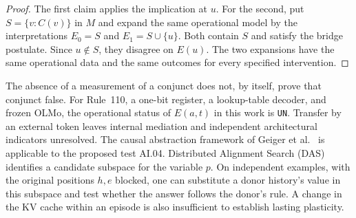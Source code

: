\begin{proof}
The first claim applies the implication at $u$. For the second, put $S=\{v:C(v)\}$ in $M$ and expand the same operational model by the interpretations $E_0=S$ and $E_1=S\cup\{u\}$. Both contain $S$ and satisfy the bridge postulate. Since $u\notin S$, they disagree on $E(u)$. The two expansions have the same operational data and the same outcomes for every specified intervention.
\end{proof}
The absence of a measurement of a conjunct does not, by itself, prove that conjunct false. For Rule~110, a one-bit register, a lookup-table decoder, and frozen OLMo, the operational status of $E(a,t)$ in this work is \texttt{UN}. Transfer by an external token leaves internal mediation and independent architectural indicators unresolved. The causal abstraction framework of Geiger et al.~\cite{geiger2025} is applicable to the proposed test AI.04. Distributed Alignment Search (DAS) identifies a candidate subspace for the variable $p$. On independent examples, with the original positions $h,e$ blocked, one can substitute a donor history's value in this subspace and test whether the answer follows the donor's rule. A change in the KV cache within an episode is also insufficient to establish lasting plasticity.
